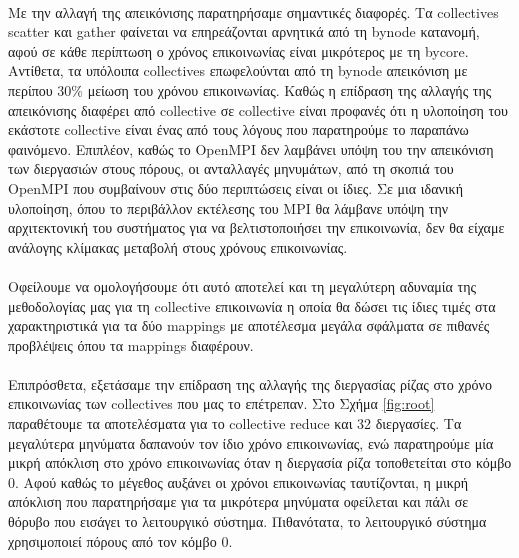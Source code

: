 \paragraph{}
Με την αλλαγή της απεικόνισης παρατηρήσαμε σημαντικές διαφορές. Τα collectives scatter και gather φαίνεται να επηρεάζονται αρνητικά από τη bynode κατανομή, αφού σε κάθε περίπτωση ο χρόνος επικοινωνίας είναι μικρότερος με τη bycore. Αντίθετα, τα υπόλοιπα collectives επωφελούνται από τη bynode απεικόνιση με περίπου 30\% μείωση του χρόνου επικοινωνίας. Καθώς η επίδραση της αλλαγής της απεικόνισης διαφέρει από collective σε collective είναι προφανές ότι η υλοποίηση του εκάστοτε collective είναι ένας από τους λόγους που παρατηρούμε το παραπάνω φαινόμενο. Επιπλέον, καθώς το OpenMPI δεν λαμβάνει υπόψη του την απεικόνιση των διεργασιών στους πόρους, οι ανταλλαγές μηνυμάτων, από τη σκοπιά του OpenMPI που συμβαίνουν στις δύο περιπτώσεις είναι οι ίδιες. Σε μια ιδανική υλοποίηση, όπου το περιβάλλον εκτέλεσης του MPI θα λάμβανε υπόψη την αρχιτεκτονική του συστήματος για να βελτιστοποιήσει την επικοινωνία, δεν θα είχαμε ανάλογης κλίμακας μεταβολή στους χρόνους επικοινωνίας. 
\paragraph{}
Οφείλουμε να ομολογήσουμε ότι αυτό αποτελεί και τη μεγαλύτερη αδυναμία της μεθοδολογίας μας για τη collective επικοινωνία η οποία θα δώσει τις ίδιες τιμές στα χαρακτηριστικά για τα δύο mappings με αποτέλεσμα μεγάλα σφάλματα σε πιθανές προβλέψεις όπου τα mappings διαφέρουν. 
\paragraph{}
Επιπρόσθετα, εξετάσαμε την επίδραση της αλλαγής της διεργασίας ρίζας στο χρόνο επικοινωνίας των collectives που μας το επέτρεπαν. Στο Σχήμα \ref{fig:root}  παραθέτουμε τα αποτελέσματα για το collective reduce και 32 διεργασίες. Τα μεγαλύτερα μηνύματα δαπανούν τον ίδιο χρόνο επικοινωνίας, ενώ παρατηρούμε μία μικρή απόκλιση στο χρόνο επικοινωνίας όταν η διεργασία ρίζα τοποθετείται στο κόμβο 0. Αφού καθώς το μέγεθος αυξάνει οι χρόνοι επικοινωνίας ταυτίζονται, η μικρή απόκλιση που παρατηρήσαμε για τα μικρότερα μηνύματα οφείλεται και πάλι σε θόρυβο που εισάγει το λειτουργικό σύστημα. Πιθανότατα, το λειτουργικό σύστημα χρησιμοποιεί πόρους από τον κόμβο 0. 

